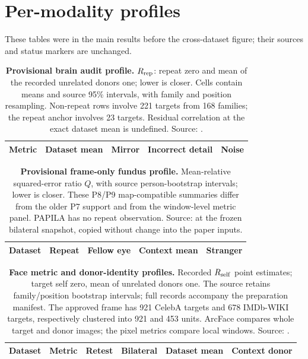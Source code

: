 \section{Per-modality profiles}
\label{sec:s-modality-tables}
These tables were in the main results before the cross-dataset figure; their sources and status markers are unchanged.

\begin{table}[!htbp]
\centering
\caption{\textbf{Provisional brain audit profile.} $R_{\rm rep}$: repeat zero and mean of the recorded unrelated donors one; lower is closer.
Cells contain means and source 95\% intervals, with family and position resampling.
Non-repeat rows involve 221 targets from 168 families; the repeat anchor involves 23 targets.
Residual correlation at the exact dataset mean is undefined.
Source: .}
\label{tab:brain}
\small
\begin{tabular}{@{}lcccc@{}}
\toprule
Metric & Dataset mean & Mirror & Incorrect detail & Noise \\
\midrule

\end{tabular}
\end{table}

\begin{table}[!htbp]
\centering
\caption{\textbf{Provisional frame-only fundus profile.}
Mean-relative squared-error ratio $Q$, with source person-bootstrap intervals; lower is closer.
These P8/P9 map-compatible summaries differ from the older P7 support and from the window-level metric panel.
PAPILA has no repeat observation.
Source:  at the frozen bilateral snapshot, copied without change into the paper inputs.}
\label{tab:fundus}
\small
\begin{tabular}{@{}lcccc@{}}
\toprule
Dataset & Repeat & Fellow eye & Context mean & Stranger \\
\midrule

\end{tabular}
\end{table}

\begin{table}[!htbp]
\centering
\caption{\textbf{Face metric and donor-identity profiles.} Recorded $R_{\rm self}$ point estimates; target self zero, mean of unrelated donors one.
The source retains family/position bootstrap intervals; full records accompany the preparation manifest.
The approved frame has 921 CelebA targets and 678 IMDb-WIKI targets, respectively clustered into 921 and 453 units.
ArcFace compares whole target and donor images; the pixel metrics compare local windows.
Source: .}
\label{tab:face}
\small
\begin{tabular}{@{}llcccc@{}}
\toprule
Dataset & Metric & Retest & Bilateral & Dataset mean & Context donor \\
\midrule

\end{tabular}
\end{table}

